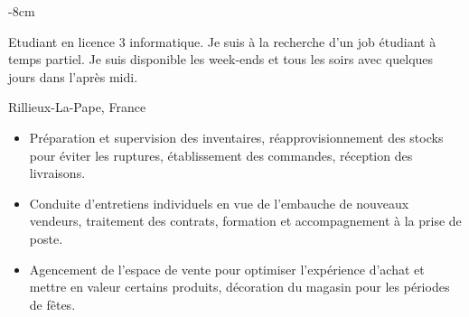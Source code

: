 \documentclass[10pt,a4paper]{altacv}
\begin{document}
  \tagline{  }

\begin{adjustwidth}{}{-8cm}
\makecvheader
\end{adjustwidth}

Etudiant en licence 3 informatique. Je suis à la recherche d’un job étudiant à temps partiel. Je suis disponible les week-ends et tous les soirs avec quelques jours dans l’après midi. 


\divider


\divider
{} {Rillieux-La-Pape, France}
\begin{itemize}
\item Préparation et supervision des inventaires, réapprovisionnement des
stocks pour éviter les ruptures, établissement des commandes,
réception des livraisons.
\item Conduite d'entretiens individuels en vue de l'embauche de nouveaux
vendeurs, traitement des contrats, formation et accompagnement à
la prise de poste.
\item Agencement de l'espace de vente pour optimiser l'expérience
d'achat et mettre en valeur certains produits, décoration du magasin
pour les périodes de fêtes.

\end{itemize}
\end{document}
